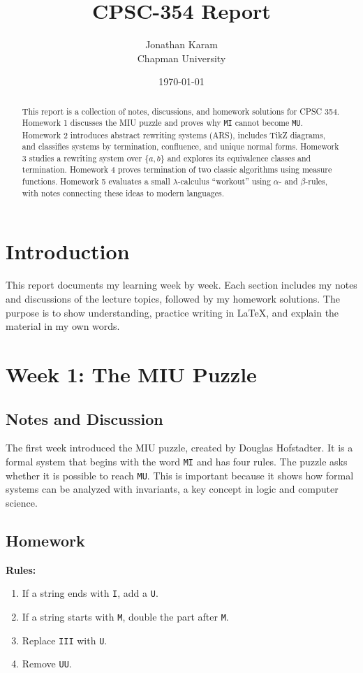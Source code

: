 \documentclass{article}
\title{CPSC-354 Report}
\author{Jonathan Karam \\ Chapman University}
\date{\today}
\theoremstyle{theorem}
\theoremstyle{definition}
\theoremstyle{remark}
\begin{document}
\maketitle

\begin{abstract}
This report is a collection of notes, discussions, and homework solutions for CPSC 354. 
Homework 1 discusses the MIU puzzle and proves why \texttt{MI} cannot become \texttt{MU}. 
Homework 2 introduces abstract rewriting systems (ARS), includes TikZ diagrams, and classifies systems by termination, confluence, and unique normal forms. 
Homework 3 studies a rewriting system over $\{a,b\}$ and explores its equivalence classes and termination.
Homework 4 proves termination of two classic algorithms using measure functions.
Homework 5 evaluates a small $\lambda$-calculus ``workout'' using $\alpha$- and $\beta$-rules, with notes connecting these ideas to modern languages.
\end{abstract}

\tableofcontents

\section{Introduction}
This report documents my learning week by week. 
Each section includes my notes and discussions of the lecture topics, followed by my homework solutions.
The purpose is to show understanding, practice writing in \LaTeX{}, and explain the material in my own words.

\section{Week 1: The MIU Puzzle}

\subsection{Notes and Discussion}
The first week introduced the MIU puzzle, created by Douglas Hofstadter. 
It is a formal system that begins with the word \texttt{MI} and has four rules. 
The puzzle asks whether it is possible to reach \texttt{MU}. 
This is important because it shows how formal systems can be analyzed with invariants, a key concept in logic and computer science.

\subsection{Homework}
\textbf{Rules:}
\begin{enumerate}
  \item If a string ends with \texttt{I}, add a \texttt{U}.
  \item If a string starts with \texttt{M}, double the part after \texttt{M}.
  \item Replace \texttt{III} with \texttt{U}.
  \item Remove \texttt{UU}.
\end{enumerate}
\end{document}
